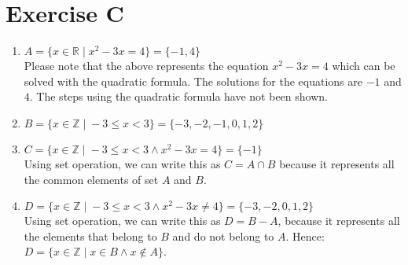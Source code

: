 \section{Exercise C} 
\begin{enumerate}[label=\alph*)]

\item $ A= \{ x \in \mathbb{R} \; | \; x^2-3x=4 \} = \{ -1,4 \} $ \\
Please note that the above represents the equation $x^2-3x=4$ which can be solved with the quadratic formula. The solutions for the equations are $-1$ and $4$. The steps using the quadratic formula have not been shown.

\item $ B= \{ x \in \mathbb{Z} \; | \; -3 \le x < 3 \} = \{ -3,-2,-1,0,1,2 \} $

\item $ C= \{ x \in \mathbb{Z} \; | \; -3 \le x < 3 \land x^2-3x=4 \} = \{ -1 \} $ \\ 
Using set operation, we can write this as $ C= A \cap B $ because it represents all the common elements of set $A$ and $B$.

\item $ D= \{ x \in \mathbb{Z} \; | \; -3 \le x < 3 \land x^2-3x \ne 4 \} = \{ -3,-2,0,1,2 \} $ \\
Using set operation, we can write this as $ D = B - A $, because it represents all the elements that belong to $B$ and do not belong to $A$. Hence: \\ $ D= \{ x \in \mathbb{Z} \; | \; x \in B \land x \not\in A \} $.

\end{enumerate}
